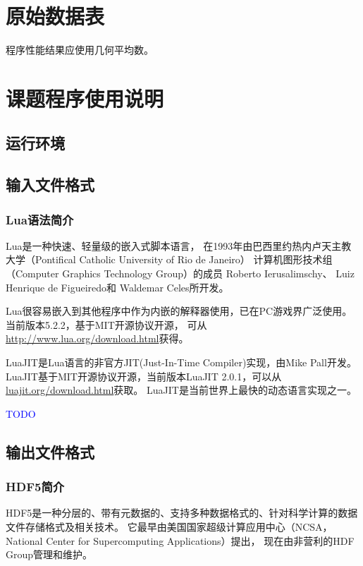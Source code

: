 \documentclass[master,xetex]{thuthesis}
\newcommand{\TODO}{ \textcolor{blue}{TODO} }
\begin{document}
\begin{appendix}

\chapter{原始数据表}



\iffalse

程序性能结果应使用几何平均数。\cite{fleming1986not}

\chapter{课题程序使用说明}
\section{运行环境}
\section{输入文件格式}
\subsection{Lua语法简介}

Lua是一种快速、轻量级的嵌入式脚本语言，
在1993年由巴西里约热内卢天主教大学（Pontifical Catholic University of Rio de Janeiro）
计算机图形技术组（Computer Graphics Technology Group）的成员
Roberto Ierusalimschy、 Luiz Henrique de Figueiredo和 Waldemar Celes所开发。

Lua很容易嵌入到其他程序中作为内嵌的解释器使用，已在PC游戏界广泛使用。
当前版本5.2.2，基于MIT开源协议开源，
可从 \url{http://www.lua.org/download.html}获得。

LuaJIT是Lua语言的非官方JIT(Just-In-Time Compiler)实现，由Mike Pall开发。
LuaJIT基于MIT开源协议开源，当前版本LuaJIT 2.0.1，可以从\url{luajit.org/download.html}获取。
LuaJIT是当前世界上最快的动态语言实现之一。\cite{LuaJITHomepage}

\TODO

\section{输出文件格式}
\subsection{HDF5简介}

HDF5是一种分层的、带有元数据的、支持多种数据格式的、针对科学计算的数据文件存储格式及相关技术。
它最早由美国国家超级计算应用中心（NCSA， 
National Center for Supercomputing Applications）提出，
现在由非营利的HDF Group管理和维护。


\end{appendix}
\end{document}
